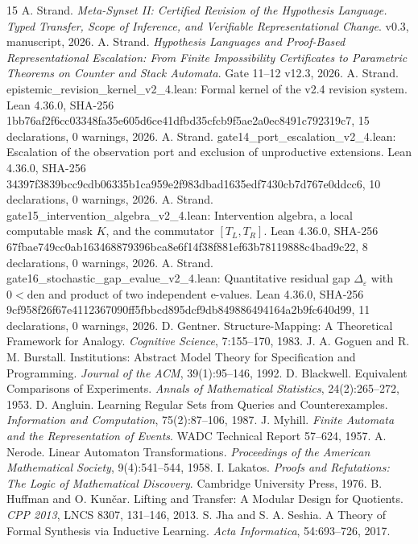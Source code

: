 \documentclass[11pt,a4paper]{article}
\begin{document}
\begin{thebibliography}{15}
 A. Strand. \emph{Meta-Synset II: Certified Revision of the Hypothesis Language. Typed Transfer, Scope of Inference, and Verifiable Representational Change}. v0.3, manuscript, 2026.
 A. Strand. \emph{Hypothesis Languages and Proof-Based Representational Escalation: From Finite Impossibility Certificates to Parametric Theorems on Counter and Stack Automata}. Gate 11–12 v12.3, 2026.
 A. Strand. epistemic\_\allowbreak revision\_\allowbreak kernel\_\allowbreak v2\_\allowbreak 4.lean: Formal kernel of the v2.4 revision system. Lean 4.36.0, SHA-256 1bb76af2f6cc0334\allowbreak 8fa35e605d6ce41d\allowbreak fbd35cfcb9f5ae2a\allowbreak 0ec8491c792319c7, 15 declarations, 0 warnings, 2026.
 A. Strand. gate14\_\allowbreak port\_\allowbreak escalation\_\allowbreak v2\_\allowbreak 4.lean: Escalation of the observation port and exclusion of unproductive extensions. Lean 4.36.0, SHA-256 34397f3839bcc9cd\allowbreak b06335b1ca959e2f\allowbreak 983dbad1635edf74\allowbreak 30cb7d767e0ddcc6, 10 declarations, 0 warnings, 2026.
 A. Strand. gate15\_\allowbreak intervention\_\allowbreak algebra\_\allowbreak v2\_\allowbreak 4.lean: Intervention algebra, a local computable mask \(K\), and the commutator \([T_L,T_R]\). Lean 4.36.0, SHA-256 67fbae749cc0ab16\allowbreak 3468879396bca8e6\allowbreak f14f38f881ef63b7\allowbreak 8119888c4bad9c22, 8 declarations, 0 warnings, 2026.
 A. Strand. gate16\_\allowbreak stochastic\_\allowbreak gap\_\allowbreak evalue\_\allowbreak v2\_\allowbreak 4.lean: Quantitative residual gap \(\Delta_\varepsilon\) with \(0<\mathrm{den}\) and product of two independent e-values. Lean 4.36.0, SHA-256 9cf958f26f67e411\allowbreak 2367090ff5fbbcd8\allowbreak 95dcf9db84988649\allowbreak 4164a2b9fc640d99, 11 declarations, 0 warnings, 2026.
 D. Gentner. Structure-Mapping: A Theoretical Framework for Analogy. \emph{Cognitive Science}, 7:155–170, 1983.
 J. A. Goguen and R. M. Burstall. Institutions: Abstract Model Theory for Specification and Programming. \emph{Journal of the ACM}, 39(1):95–146, 1992.
 D. Blackwell. Equivalent Comparisons of Experiments. \emph{Annals of Mathematical Statistics}, 24(2):265–272, 1953.
 D. Angluin. Learning Regular Sets from Queries and Counterexamples. \emph{Information and Computation}, 75(2):87–106, 1987.
 J. Myhill. \emph{Finite Automata and the Representation of Events}. WADC Technical Report 57–624, 1957.
 A. Nerode. Linear Automaton Transformations. \emph{Proceedings of the American Mathematical Society}, 9(4):541–544, 1958.
 I. Lakatos. \emph{Proofs and Refutations: The Logic of Mathematical Discovery}. Cambridge University Press, 1976.
 B. Huffman and O. Kunčar. Lifting and Transfer: A Modular Design for Quotients. \emph{CPP 2013}, LNCS 8307, 131–146, 2013.
 S. Jha and S. A. Seshia. A Theory of Formal Synthesis via Inductive Learning. \emph{Acta Informatica}, 54:693–726, 2017.
\end{thebibliography}
\end{document}
